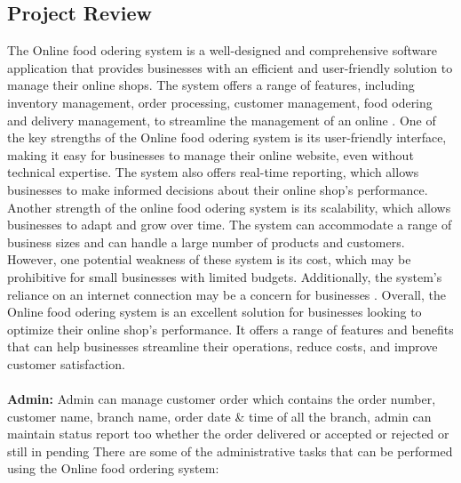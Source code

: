 \subsection{Project Review}

The Online food odering system is a well-designed and comprehensive software application that provides businesses with an efficient and user-friendly solution to manage their online shops. The system offers a range of features, including inventory management, order processing, customer management, food odering and delivery management, to streamline the management of an online . One of the key strengths of the Online food odering system is its user-friendly interface,
making it easy for businesses to manage their online website, even without technical expertise. The system also offers real-time reporting, which allows businesses to make informed decisions about their online shop's performance. Another strength of the online food odering system is its scalability, which allows businesses to adapt and grow over time. The system can accommodate a range of business sizes and can handle a large number of products and customers. However, one potential weakness of these system is its cost, which may be prohibitive
for small businesses with limited budgets. Additionally, the system's reliance on an internet connection may be a concern for businesses . Overall, the Online food odering system is an excellent solution for businesses looking to optimize their online shop's performance. It offers a range of features and benefits that can help businesses streamline their operations, reduce costs, and improve customer satisfaction.
\\
\\
\textbf{Admin:} Admin can manage customer order which contains the order number, customer name, branch name, order date & time of all the branch, admin can maintain status report too whether the order delivered or accepted or rejected or still in pending There are some of the administrative tasks that can be performed using the Online food ordering system:

